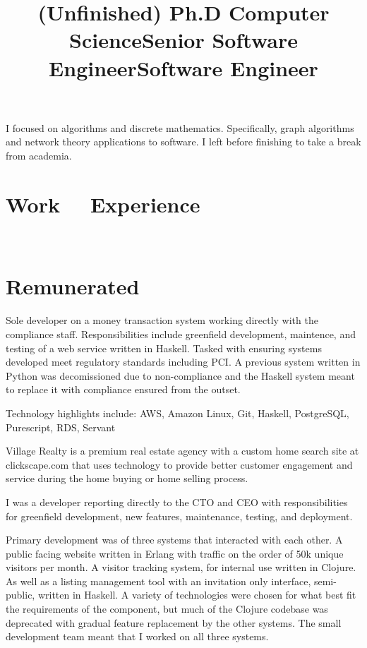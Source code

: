 \documentclass[margintitle,line]{res}
\renewcommand{\subsection}[1]{\section{\normalfont #1}}
\begin{document}
\begin{resume}
\title{(Unfinished) Ph.D Computer Science}
\begin{position}
I focused on algorithms and discrete mathematics. Specifically, graph
algorithms and network theory applications to software. I left before
finishing to take a break from academia.
\end{position}

\section{Work \ \ Experience}
\ \\
\subsection{Remunerated}

\title{Senior Software Engineer}
\begin{position}
  Sole developer on a money transaction system working directly with the
  compliance staff. Responsibilities include greenfield
  development, maintence, and testing of a web service written in Haskell. Tasked
  with ensuring systems developed meet regulatory standards including PCI. A
  previous system written in Python was decomissioned due to non-compliance and
  the Haskell system meant to replace it with compliance ensured from the outset.

  Technology highlights include: AWS, Amazon Linux, Git, Haskell, PostgreSQL,
  Purescript, RDS, Servant
\end{position}

\title{Software Engineer}
\begin{position}
  Village Realty is a premium real estate agency with a custom home search site
  at clickscape.com that uses technology to provide better customer engagement
  and service during the home buying or home selling process.

  I was a developer reporting directly to the CTO and CEO with responsibilities
  for greenfield development, new features, maintenance, testing, and deployment.

  Primary development was of three systems that interacted with each other.
  A public facing website  written in Erlang with traffic on the order of 50k
  unique visitors per month. A visitor tracking system, for internal use written
  in Clojure. As well as a listing management tool with an invitation only
  interface, semi-public, written in Haskell. A variety of technologies were
  chosen for what best fit the requirements of the component, but much of the
  Clojure codebase was deprecated with gradual feature replacement by the other
  systems. The small development team meant that I worked on all three systems.


\end{position}
\end{resume}
\end{document}

